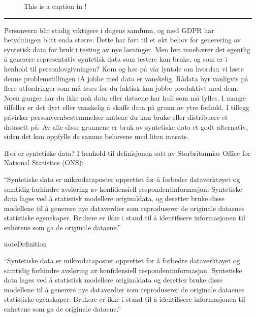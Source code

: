 \documentclass[letterpaper,10pt,english]{jupyterBook}
\let\sphinxpxdimen\pdfpxdimen\else\newdimen\sphinxpxdimen
\begin{document}
\noindent{}

\begin{figure}[htbp]
\centering
\capstart

\noindent\sphinxincludegraphics[width=200\sphinxpxdimen]{{src/dsforum/images/sVSm}.png}
\caption{This is a caption in !}\label{\detokenize{src/dsforum/fake_synth/DSF_intro:markdown-fig}}\end{figure}


\bigskip\hrule\bigskip


\noindent{}

\sphinxAtStartPar
Personvern blir stadig viktigere i dagens samfunn, og med GDPR har betydningen blitt enda større. Dette har ført til et økt behov for generering av syntetisk data for bruk i testing av nye løsninger. Men hva innebærer det egentlig å generere representativ syntetisk data som testere kan bruke, og som er i henhold til personlovgivningen? Kom og hør på vår lyntale om hvordan vi løste denne problemstillingen iÅ jobbe med data er vanskelig. Rådata byr vanligvis på flere utfordringer som må løses før du faktisk kan jobbe produktivt med dem. Noen ganger har du ikke nok data eller dataene har hull som må fylles. I mange tilfeller er det dyrt eller vanskelig å skaffe data på grunn av ytre forhold. I tillegg påvirker personvernbestemmelser måtene du kan bruke eller distribuere et datasett på. Av alle disse grunnene er bruk av syntetiske data et godt alternativ, siden det kan oppfylle de samme behovene med liten innsats.

\sphinxAtStartPar
Hva er syntetiske data?
I henhold til definisjonen satt av Storbritannias Office for National Statistics (ONS):

\sphinxAtStartPar
“Syntetiske data er mikrodataposter opprettet for å forbedre dataverktøyet og samtidig forhindre avsløring av konfidensiell respondentinformasjon. Syntetiske data lages ved å statistisk modellere originaldata, og deretter bruke disse modellene til å generere nye dataverdier som reproduserer de originale dataenes statistiske egenskaper. Brukere er ikke i stand til å identifisere informasjonen til enhetene som ga de originale dataene.”

\begin{sphinxadmonition}{note}{Definition}

\sphinxAtStartPar
“Syntetiske data er mikrodataposter opprettet for å forbedre dataverktøyet og samtidig forhindre avsløring av konfidensiell respondentinformasjon. Syntetiske data lages ved å statistisk modellere originaldata og deretter bruke disse modellene til å generere nye dataverdier som reproduserer de originale dataenes statistiske egenskaper. Brukere er ikke i stand til å identifisere informasjonen til enhetene som ga de originale dataene.”
\end{sphinxadmonition}
\end{document}
